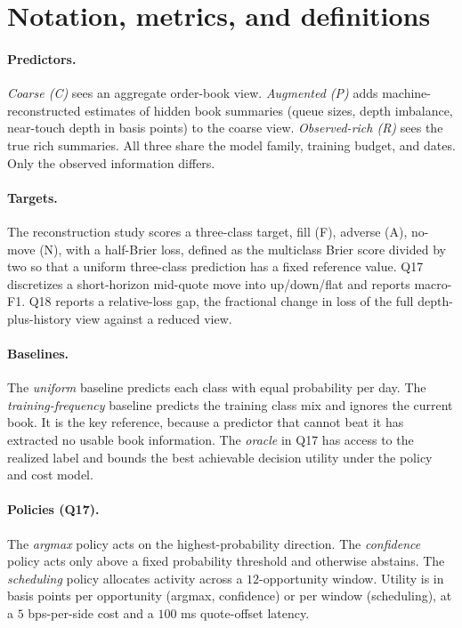 \section{Notation, metrics, and definitions}
\label{app:notation}

\paragraph{Predictors.} \emph{Coarse (C)} sees an aggregate order-book view. \emph{Augmented
(P)} adds machine-reconstructed estimates of hidden book summaries (queue sizes, depth
imbalance, near-touch depth in basis points) to the coarse view. \emph{Observed-rich (R)} sees
the true rich summaries. All three share the model family, training budget, and dates. Only the
observed information differs.

\paragraph{Targets.} The reconstruction study scores a three-class target, fill (F), adverse
(A), no-move (N), with a half-Brier loss, defined as the multiclass Brier score divided by
two so that a uniform three-class prediction has a fixed reference value. Q17 discretizes a
short-horizon mid-quote move into up/down/flat and reports macro-F1. Q18 reports a relative-loss
gap, the fractional change in loss of the full depth-plus-history view against a reduced view.

\paragraph{Baselines.} The \emph{uniform} baseline predicts each class with equal probability
per day. The \emph{training-frequency} baseline predicts the training class mix and ignores the
current book. It is the key reference, because a predictor that cannot beat it has extracted no
usable book information. The \emph{oracle} in Q17 has access to the realized label and bounds
the best achievable decision utility under the policy and cost model.

\paragraph{Policies (Q17).} The \emph{argmax} policy acts on the highest-probability direction. The \emph{confidence} policy acts only above a fixed probability threshold and otherwise
abstains. The \emph{scheduling} policy allocates activity across a $12$-opportunity window.
Utility is in basis points per opportunity (argmax, confidence) or per window (scheduling), at
a $5$ bps-per-side cost and a $100$ ms quote-offset latency.

